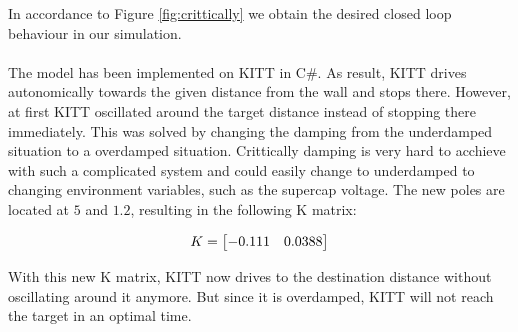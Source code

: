 \documentclass[final]{scrreprt} %
\begin{document}
In accordance to Figure \ref{fig:crittically} we obtain the desired closed loop behaviour in our simulation.
\\ \\
The model has been implemented on KITT in C\#. As result, KITT drives autonomically towards the given distance from the wall and stops there. However, at first KITT oscillated around the target distance instead of stopping there immediately. This was solved by changing the damping from the underdamped situation to a overdamped situation. Crittically damping is very hard to acchieve with such a complicated system and could easily change to underdamped to changing environment variables, such as the supercap voltage. The new poles are located at $5$ and $1.2$, resulting in the following K matrix:

\begin{equation}
\centering
K = 
\begin{bmatrix}
  -0.111 & 0.0388
\end{bmatrix}
\end{equation}

With this new K matrix, KITT now drives to the destination distance without oscillating around it anymore. But since it is overdamped, KITT will not reach the target in an optimal time.
\end{document}
